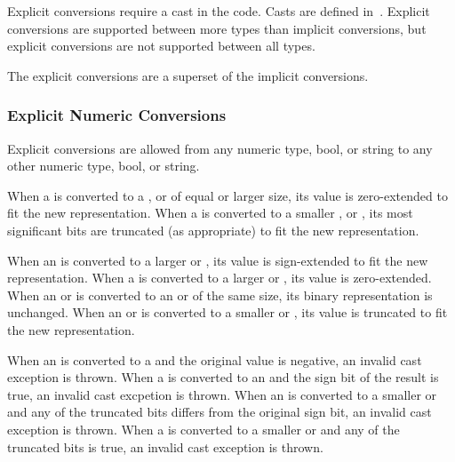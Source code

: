 Explicit conversions require a cast in the code.  Casts are defined
in~.  Explicit conversions are supported between more
types than implicit conversions, but explicit conversions are not
supported between all types.

The explicit conversions are a superset of the implicit conversions.

\subsubsection{Explicit Numeric Conversions}
\label{Explicit_Numeric_Conversions}

Explicit conversions are allowed from any numeric type, bool, or
string to any other numeric type, bool, or string.  

When a  is converted to a , 
or  of equal or larger size, its value is zero-extended to fit the
new representation.  When a  is converted to a
smaller ,  or , its most significant
bits are truncated (as appropriate) to fit the new representation.

When an  is converted to a larger  or , its value is
sign-extended to fit the new representation.  
When a  is converted to a larger  or , its value
is zero-extended.
When an  or  is converted to an  or 
of the same size, its binary representation is unchanged.
When an  or  is converted to a smaller 
or , its value is truncated to fit the new representation.

When an  is converted to a  and the original value is
negative, an invalid cast exception is thrown.
When a  is converted to an  and the sign bit of the result
is true, an invalid cast excpetion is thrown.
When an  is converted to a smaller  or  and any
of the truncated bits differs from the original sign bit, an invalid cast
exception is thrown.
When a  is converted to a smaller  or  and any
of the truncated bits is true, an invalid cast exception is thrown.


